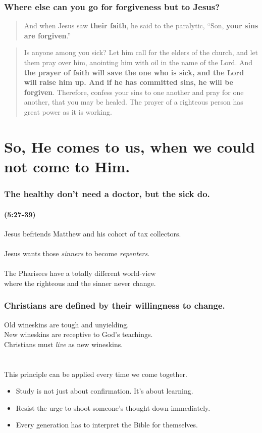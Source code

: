\documentclass{beamer}
\begin{document}
\begin{frame}
\frametitle{Where else can you go for forgiveness but to Jesus?}
\begin{quote} 
And when Jesus saw \textbf{their faith}, he said to the paralytic, ``Son, \textbf{your sins are forgiven}.''

\end{quote}

\begin{quote}
Is anyone among you sick? Let him call for the elders of the church, and let them pray over him, anointing him with oil in the name of the Lord. And \textbf{the prayer of faith will save the one who is sick, and the Lord will raise him up. And if he has committed sins, he will be forgiven}. Therefore, confess your sins to one another and pray for one another, that you may be healed. The prayer of a righteous person has great power as it is working.

\end{quote}

\end{frame}

\section{So, He comes to us, when we could not come to Him.}

\begin{frame}
\frametitle{The healthy don't need a doctor, but the sick do.}
\framesubtitle{(5:27-39)}
Jesus befriends Matthew and his cohort of tax collectors.\\~\\
Jesus wants those \emph{sinners} to become \emph{repenters}.\\~\\
The Pharisees have a totally different world-view\\where the righteous and the sinner never change.
\end{frame}

\begin{frame}
\frametitle{Christians are defined by their willingness to change.}
Old wineskins are tough and unyielding.\\
New wineskins are receptive to God's teachings.\\
Christians must \emph{live} as new wineskins.\\~\\~\\
This principle can be applied every time we come together.
\begin{itemize}
\item Study is not just about confirmation. It's about learning.
\item Resist the urge to shoot someone's thought down immediately.
\item Every generation has to interpret the Bible for themselves.
\end{itemize}

\end{frame}
\end{document}
